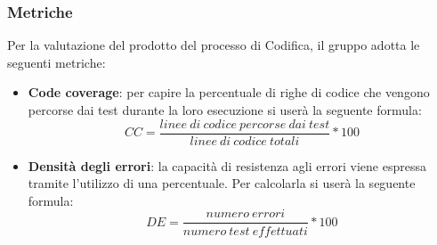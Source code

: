 \subsubsection{Metriche}
Per la valutazione del prodotto del processo di Codifica, il gruppo adotta le seguenti metriche:
\begin{itemize}
	\item \textbf{Code coverage}: per capire la percentuale di righe di codice che vengono percorse dai test durante la loro esecuzione si userà la seguente formula:
\[CC=\frac{linee \ di \ codice \ percorse \ dai \ test}{linee \ di \ codice \ totali}*100\]
	\item \textbf{Densità degli errori}: la capacità di resistenza agli errori viene espressa tramite l'utilizzo di una percentuale. Per calcolarla si userà la seguente formula:
\[DE=\frac{numero \ errori}{numero \ test \ effettuati}*100\]
\end{itemize}
 